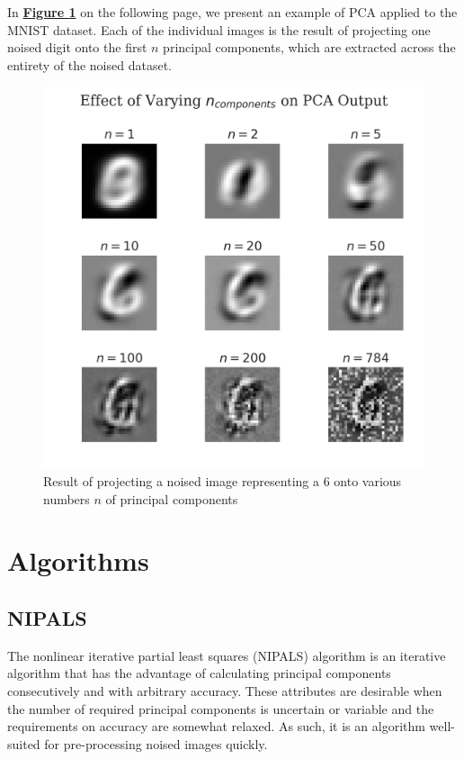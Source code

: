 \documentclass[12pt]{article}
\begin{document}
In \textbf{\hyperref[PCA]{Figure \ref*{PCA}}} on the following page, we present an example of PCA applied to the MNIST dataset. Each of the individual images is the result of projecting one noised digit onto the first $n$ principal components, which are extracted across the entirety of the noised dataset. 

\begin{figure}[H]
\begin{center}
\includegraphics[width=\textwidth]{set_10.png}
\caption{Result of projecting a noised image representing a $6$ onto various numbers $n$ of principal components}
\label{PCA}
\end{center}
\end{figure}

\pagebreak
\section{Algorithms}\label{3}

\subsection{NIPALS}\label{3.1}
The nonlinear iterative partial least squares (NIPALS) algorithm is an iterative algorithm that has the advantage of calculating principal components consecutively and with arbitrary accuracy. These attributes are desirable when the number of required principal components is uncertain or variable and the requirements on accuracy are somewhat relaxed. As such, it is an algorithm well-suited for pre-processing noised images quickly.
\end{document}
